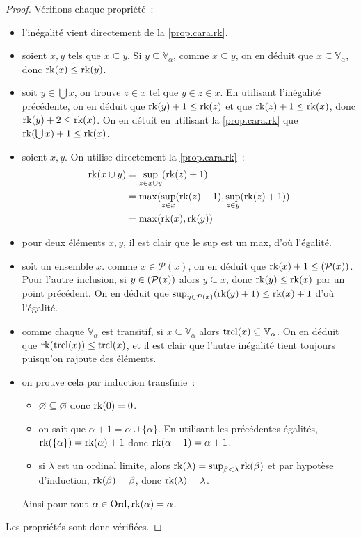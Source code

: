 \begin{proof}
  Vérifions chaque propriété~:
  \begin{itemize}
  \item l'inégalité vient directement de la \cref{prop.cara.rk}.
  \item soient $x,y$ tels que $x\subseteq y$. Si $y\subseteq\mathbb V_\alpha$,
    comme $x\subseteq y$, on en déduit que $x\subseteq\mathbb V_\alpha$, donc
    $\operatorname{rk}(x)\leq \operatorname{rk}(y)$.
  \item soit $y\in \bigcup x$, on trouve $z\in x$ tel que $y\in z \in x$. En
    utilisant l'inégalité précédente, on en déduit que $\operatorname{rk}(y) + 1 \leq \operatorname{rk}(z)$
    et que $\operatorname{rk}(z) + 1 \leq \operatorname{rk}(x)$, donc $\operatorname{rk}(y) + 2 \leq \operatorname{rk}(x)$. On en détuit
    en utilisant la \cref{prop.cara.rk} que $\operatorname{rk}(\bigcup x) + 1 \leq \operatorname{rk}(x)$.
  \item soient $x,y$. On utilise directement la \cref{prop.cara.rk}~:
    \begin{align*}
      \operatorname{rk}(x\cup y) &= \sup_{z \in x \cup y} (\operatorname{rk}(z) + 1)\\
      &= \max(\sup_{z \in x} (\operatorname{rk}(z) + 1), \sup_{z\in y} (\operatorname{rk}(z) + 1))\\
      &= \max(\operatorname{rk}(x),\operatorname{rk}(y))
    \end{align*}
  \item pour deux éléments $x,y$, il est clair que le sup est un max, d'où
    l'égalité.
  \item soit un ensemble $x$. comme $x\in \mathcal P(x)$, on en déduit que
    $\operatorname{rk}(x) + 1 \leq \mathcal (\mathcal{P} (x))$. Pour l'autre inclusion, si
    $y\in \mathcal (\mathcal{P}(x))$ alors $y\subseteq x$, donc
    $\operatorname{rk}(y) \leq \operatorname{rk}(x)$ par un point précédent. On en déduit que
    $\sup_{y\in \mathcal{P}(x)} (\operatorname{rk}(y) + 1) \leq \operatorname{rk}(x) + 1$ d'où
    l'égalité.
  \item comme chaque $\mathbb V_\alpha$ est transitif, si
    $x\subseteq \mathbb V_\alpha$ alors $\operatorname{trcl}(x)\subseteq \mathbb V_\alpha$. On
    en déduit que $\operatorname{rk}(\operatorname{trcl}(x)) \leq \operatorname{trcl}(x)$, et il est clair que l'autre
    inégalité tient toujours puisqu'on rajoute des éléments.
  \item on prouve cela par induction transfinie~:
    \begin{itemize}
    \item $\varnothing \subseteq \varnothing$ donc $\operatorname{rk}(0) = 0$.
    \item on sait que $\alpha + 1 = \alpha \cup \{\alpha\}$. En utilisant les
      précédentes égalités, $\operatorname{rk}(\{\alpha\}) = \operatorname{rk}(\alpha) + 1$ donc
      $\operatorname{rk}(\alpha + 1) = \alpha + 1$.
    \item si $\lambda$ est un ordinal limite, alors
      $\operatorname{rk}(\lambda) = \sup_{\beta < \lambda} \operatorname{rk}(\beta)$ et par hypotèse
      d'induction, $\operatorname{rk}(\beta) = \beta$, donc $\operatorname{rk}(\lambda) = \lambda$.
    \end{itemize}
    Ainsi pour tout $\alpha \in \operatorname{Ord}, \operatorname{rk}(\alpha) = \alpha$.
  \end{itemize}
  Les propriétés sont donc vérifiées.
\end{proof}

